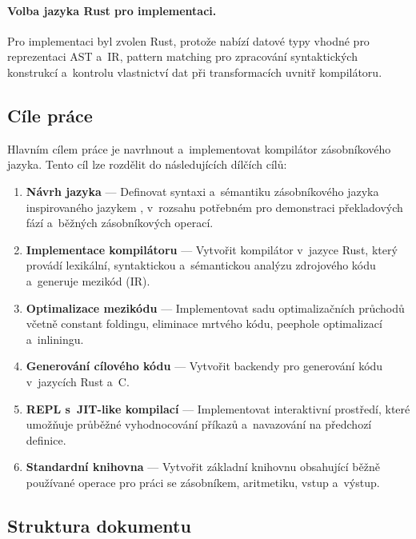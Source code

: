 \paragraph{Volba jazyka Rust pro implementaci.}
Pro implementaci byl zvolen Rust, protože nabízí datové typy vhodné pro
reprezentaci AST a~IR, pattern matching pro zpracování syntaktických konstrukcí
a~kontrolu vlastnictví dat při transformacích uvnitř kompilátoru.


\subsection{Cíle práce}
\label{sec:cile}

Hlavním cílem práce je navrhnout a~implementovat kompilátor zásobníkového
jazyka. Tento cíl lze rozdělit do následujících dílčích cílů:

\begin{enumerate}
	\item \textbf{Návrh jazyka \Roth{}} --- Definovat syntaxi a~sémantiku
	      zásobníkového jazyka inspirovaného jazykem \Forth{}, v~rozsahu
	      potřebném pro demonstraci překladových fází a~běžných zásobníkových
	      operací.

	\item \textbf{Implementace kompilátoru} --- Vytvořit kompilátor
	      v~jazyce Rust, který provádí lexikální, syntaktickou a~sémantickou
	      analýzu zdrojového kódu a~generuje mezikód (IR).

	\item \textbf{Optimalizace mezikódu} --- Implementovat sadu
	      optimalizačních průchodů včetně constant foldingu, eliminace
	      mrtvého kódu, peephole optimalizací a~inliningu.

	\item \textbf{Generování cílového kódu} --- Vytvořit backendy
	      pro generování kódu v~jazycích Rust a~C.

	\item \textbf{REPL s~JIT-like kompilací} --- Implementovat interaktivní
	      prostředí, které umožňuje průběžné vyhodnocování příkazů a~navazování
	      na předchozí definice.

	\item \textbf{Standardní knihovna} --- Vytvořit základní knihovnu
	      obsahující běžně používané operace pro práci se zásobníkem,
	      aritmetiku, vstup a~výstup.
\end{enumerate}


\subsection{Struktura dokumentu}
\label{sec:struktura}


